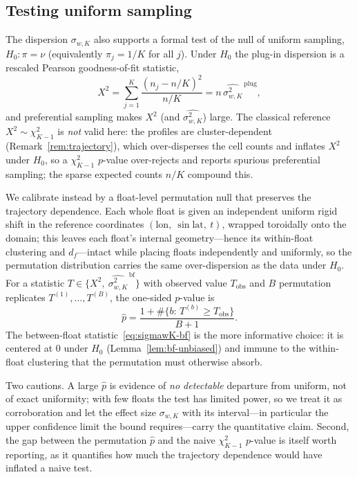 \subsection{Testing uniform sampling}
\label{sec:uniformity-test}

The dispersion $\sigma_{w,K}$ also supports a formal test of the null of
uniform sampling, $H_0:\pi=\nu$ (equivalently $\pi_j=1/K$ for all $j$).
Under $H_0$ the plug-in dispersion is a rescaled Pearson
goodness-of-fit statistic,
\[
  X^2=\sum_{j=1}^{K}\frac{(n_j-n/K)^2}{n/K}
     =n\,\widehat{\sigma_{w,K}^2}^{\,\mathrm{plug}},
\]
and preferential sampling makes $X^2$ (and $\widehat{\sigma_{w,K}^2}$)
large. The classical reference $X^2\sim\chi^2_{K-1}$ is \emph{not} valid
here: the profiles are cluster-dependent (Remark~\ref{rem:trajectory}),
which over-disperses the cell counts and inflates $X^2$ under $H_0$, so a
$\chi^2_{K-1}$ $p$-value over-rejects and reports spurious preferential
sampling; the sparse expected counts $n/K$ compound this.

We calibrate instead by a float-level permutation null that preserves
the trajectory dependence. Each whole float is given an independent
uniform rigid shift in the reference coordinates
$(\mathrm{lon},\ \sin\mathrm{lat},\ t)$, wrapped toroidally onto the
domain; this leaves each float's internal geometry---hence its
within-float clustering and $d_f$---intact while placing floats
independently and uniformly, so the permutation distribution carries the
same over-dispersion as the data under $H_0$. For a statistic
$T\in\{X^2,\ \widehat{\sigma_{w,K}^2}^{\,\mathrm{bf}}\}$ with observed
value $T_{\mathrm{obs}}$ and $B$ permutation replicates
$T^{(1)},\dots,T^{(B)}$, the one-sided $p$-value is
\[
  \hat p=\frac{1+\#\{b:\,T^{(b)}\ge T_{\mathrm{obs}}\}}{B+1}.
\]
The between-float statistic~\eqref{eq:sigmawK-bf} is the more
informative choice: it is centered at $0$ under $H_0$
(Lemma~\ref{lem:bf-unbiased}) and immune to the within-float clustering
that the permutation must otherwise absorb.

Two cautions. A large $\hat p$ is evidence of \emph{no detectable}
departure from uniform, not of exact uniformity; with few floats the
test has limited power, so we treat it as corroboration and let the
effect size $\sigma_{w,K}$ with its interval---in particular the upper
confidence limit the bound requires---carry the quantitative claim.
Second, the gap between the permutation $\hat p$ and the naive
$\chi^2_{K-1}$ $p$-value is itself worth reporting, as it quantifies how
much the trajectory dependence would have inflated a naive test.

